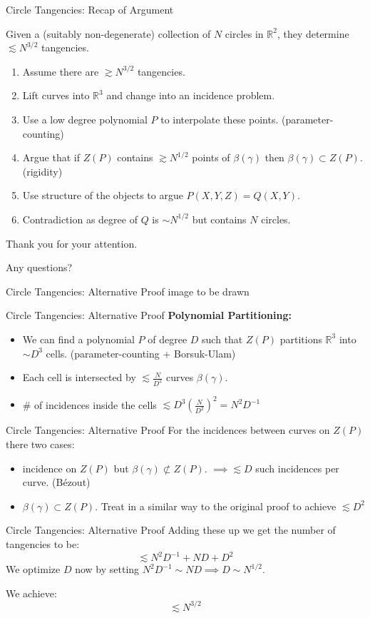 \documentclass{beamer}
\newcommand{\RR}{\mathbb R}
\newcommand{\nfr}[1]{\begin{frame} #1
\end{frame}}
\begin{document}
\nfr{{Circle Tangencies: Recap of Argument}
\begin{theorem}
    Given a (suitably non-degenerate) collection of $N$ circles in $\RR^2$, they determine $\lesssim N^{3/2}$ tangencies.
\end{theorem}
\begin{enumerate}
    \item Assume there are $\gtrsim N^{3/2}$ tangencies.
    \item Lift curves into $\RR^3$ and change into an incidence problem.
    \item Use a low degree polynomial $P$ to interpolate these points. (parameter-counting)
    \item Argue that if $Z(P)$ contains $\gtrsim N^{1/2}$ points of $\beta(\gamma)$ then $\beta(\gamma) \subset Z(P)$. (rigidity)
    \item Use structure of the objects to argue $P(X,Y,Z) = Q(X,Y)$.
    \item Contradiction as degree of $Q$ is $\sim N^{1/2}$ but contains $N$ circles.
\end{enumerate}
}
\nfr{{}
\begin{center}
Thank you for your attention.

Any questions? 

\end{center}
}

\nfr{{Circle Tangencies: Alternative Proof }
image to be drawn
}

\nfr{{Circle Tangencies: Alternative Proof }
\textbf{Polynomial Partitioning:} 
\begin{itemize}
    \item We can find a polynomial $P$ of degree $D$ such that $Z(P)$ partitions $\RR^3$ into $\sim D^3$ cells. (parameter-counting + Borsuk-Ulam)
    \item Each cell is intersected by $\lesssim \frac{N}{D^2}$ curves $\beta(\gamma)$.
    \item \# of incidences inside the cells $\lesssim D^3 \left(\frac{N}{D^2} \right)^2 = N^2 D^{-1}$
\end{itemize}}

\nfr{{Circle Tangencies: Alternative Proof }
For the incidences between curves on $Z(P)$ there two cases:
\begin{itemize}
    \item incidence on $Z(P)$ but $\beta(\gamma) \not \subset Z(P)$. $\implies \lesssim D$ such incidences per curve. (Bézout)
    \item $\beta(\gamma)  \subset Z(P)$. Treat in a similar way to the original proof to achieve $\lesssim D^2$
\end{itemize}

}

\nfr{{Circle Tangencies: Alternative Proof }
Adding these up we get the number of tangencies to be:
\[
\lesssim  N^2 D^{-1} + ND + D^2   
\]
We optimize $D$ now by setting $N^2 D^{-1} \sim ND \implies D \sim N^{1/2}$. \pause

We achieve:
\[
    \lesssim  N^{3/2} 
\]

}





\end{document}
